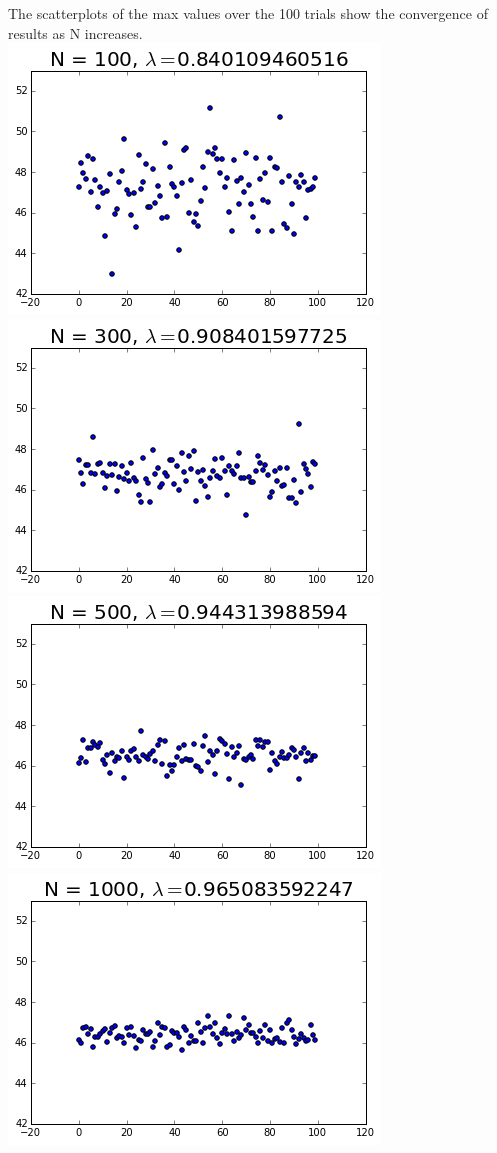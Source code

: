 \documentclass{article}
\begin{document}
		The scatterplots of the max values over the 100 trials show the convergence of results as N increases.\\
		{\centering
		\hspace*{-3.75cm}
		\includegraphics[scale=0.55]{100_scatter}
		\includegraphics[scale=0.55]{300_scatter}
		\hspace*{-3.75cm}
		\includegraphics[scale=0.55]{500_scatter}
		\includegraphics[scale=0.55]{1000_scatter}	
}
\end{document}
